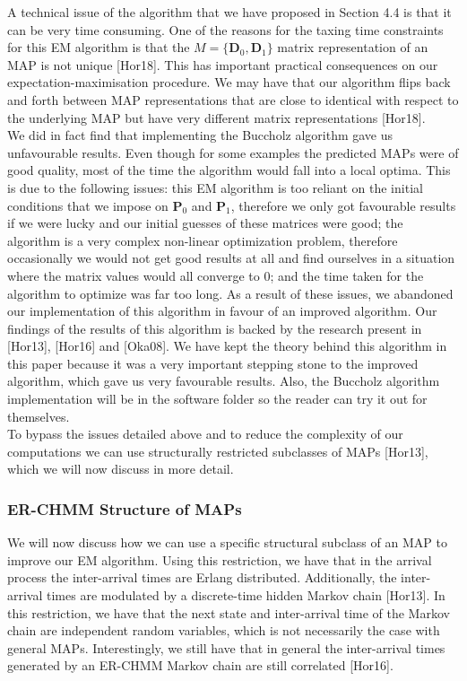 \documentclass[a4paper,11pt,titlepage]{article}
\begin{document}
A technical issue of the algorithm that we have proposed in Section 4.4 is that it can be very time consuming. One of the reasons for the taxing time constraints for this EM algorithm is that the $M = \{\mathbf{D}_0, \mathbf{D}_1\}$ matrix representation of an MAP is not unique [Hor18]. This has important practical consequences on our expectation-maximisation procedure. We may have that our algorithm flips back and forth between MAP representations that are close to identical with respect to the underlying MAP but have very different matrix representations [Hor18]. \\

We did in fact find that implementing the Buccholz algorithm gave us unfavourable results. Even though for some examples the predicted MAPs were of good quality, most of the time the algorithm would fall into a local optima. This is due to the following issues: this EM algorithm is too reliant on the initial conditions that we impose on $\mathbf{P}_0$ and $\mathbf{P}_1$, therefore we only got favourable results if we were lucky and our initial guesses of these matrices were good; the algorithm is a very complex non-linear optimization problem, therefore occasionally we would not get good results at all and find ourselves in a situation where the matrix values would all converge to 0; and the time taken for the algorithm to optimize was far too long. As a result of these issues, we abandoned our implementation of this algorithm in favour of an improved algorithm. Our findings of the results of this algorithm is backed by the research present in [Hor13], [Hor16] and [Oka08].  We have kept the theory behind this algorithm in this paper because it was a very important stepping stone to the improved algorithm, which gave us very favourable results. Also, the Buccholz algorithm implementation will be in the software folder so the reader can try it out for themselves. \\

To bypass the issues detailed above and to reduce the complexity of our computations we can use structurally restricted subclasses of MAPs [Hor13], which we will now discuss in more detail.

\subsubsection{ER-CHMM Structure of MAPs}

We will now discuss how we can use a specific structural subclass of an MAP to improve our EM algorithm. Using this restriction, we have that in the arrival process the inter-arrival times are Erlang distributed. Additionally, the inter-arrival times are modulated by a discrete-time hidden Markov chain [Hor13]. In this restriction, we have that the next state and inter-arrival time of the Markov chain are independent random variables, which is not necessarily the case with general MAPs. Interestingly, we still have that in general the inter-arrival times generated by an ER-CHMM Markov chain are still correlated [Hor16]. \\
\end{document}
